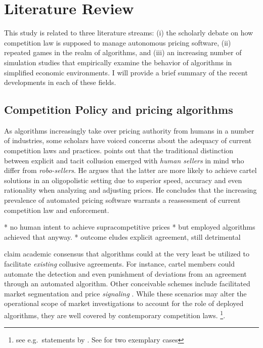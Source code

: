 \section{Literature Review}
This study is related to three literature streams: (i) the scholarly debate on how competition law is supposed to manage autonomous pricing software, (ii)  repeated games in the realm of algorithms, and (iii) an increasing number of simulation studies that empirically examine the behavior of algorithms in simplified economic environments. I will provide a brief summary of the recent developments in each of these fields.

\subsection{Competition Policy and pricing algorithms}
As algorithms increasingly take over pricing authority from humans in a number of industries, some scholars have voiced concerns about the adequacy of current competition laws and practices. \textcite{mehra_antitrust_2015} points out that the traditional distinction between explicit and tacit collusion emerged with \emph{human sellers} in mind who differ from \emph{robo-sellers}. He argues that the latter are more likely to achieve cartel solutions in an oligopolistic setting due to superior speed, accuracy and even rationality when analyzing and adjusting prices. He concludes that the increasing prevalence of automated pricing software warrants a reassessment of current competition law and enforcement. 

* no human intent to achieve supracompetitive prices
	* but employed algorithms achieved that anyway. 
	* outcome eludes explicit agreement, still detrimental

\textcite{ezrachi_sustainable_2018} claim academic consensus that algorithms could at the very least be utilized to facilitate \emph{existing} collusive agreements. For instance, cartel members could automate the detection and even punishment of deviations from an agreement through an automated algorithm. Other conceivable schemes include facilitated market segmentation \parencite{oefgen_decision_2019} and price \emph{signaling} \parencite{oecd_price_2016}. While these scenarios may alter the operational scope of market investigations to account for the role of deployed algorithms, they are well covered by contemporary competition laws.  \footnote{see e.g.\ statements by \cite{bundeskartellamt_bundeskartellamt_nodate}. See \textcite{cma_case_2016} \textcite{oefgen_decision_2019}for two exemplary cases}. 




